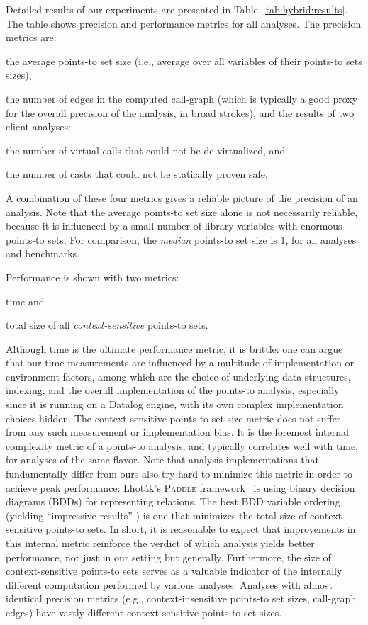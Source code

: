 Detailed results of our experiments are presented in Table~\ref{tab:hybrid:results}.  The table shows precision and performance metrics for all analyses. The precision metrics are:
\begin{inparaenum}[(1)]
\item the average points-to set size (i.e., average over all variables of their
points-to sets sizes),
\item the number of edges in the computed call-graph (which is typically a good proxy for the overall precision of the analysis, in broad strokes), and
the results of two client analyses:
\item the number of virtual calls that could not be de-virtualized, and
\item the number of casts that could not be statically proven safe.
\end{inparaenum}
A combination of these four metrics gives a reliable picture of the precision of an analysis. Note that the average points-to set size alone is not necessarily reliable, because it is influenced by a small number of library variables with enormous points-to sets. For comparison, the \emph{median} points-to set size is 1, for all analyses and benchmarks.

Performance is shown with two metrics:
\begin{inparaenum}[(1)]
\item time and
\item total size of all \emph{context-sensitive} points-to sets.
\end{inparaenum}
Although time is the ultimate performance metric, it is brittle: one can argue that our time measurements are influenced by a multitude of implementation or environment factors, among which are the choice of underlying data structures, indexing, and the overall implementation of the points-to analysis, especially since it is running on a Datalog engine, with its own complex implementation choices hidden. The context-sensitive points-to set size metric does not suffer from any such measurement or implementation bias. It is the foremost internal complexity metric of a points-to analysis, and typically correlates well with time, for analyses of the same flavor. Note that analysis implementations that fundamentally differ from ours also try hard to minimize this metric in order to achieve peak performance: Lhot\'{a}k's \textsc{Paddle} framework~\cite{thesis:Lhotak} is using binary decision diagrams (BDDs) for representing relations. The best BDD variable ordering (yielding ``impressive results'' \cite{pldi:2003:Berndl}) is one that minimizes the total size of context-sensitive points-to sets. In short, it is reasonable to expect that improvements in this internal metric reinforce the verdict of which analysis yields better performance, not just in our setting but generally. Furthermore, the size of context-sensitive points-to sets serves as a valuable indicator of the internally different computation performed by various analyses: Analyses with almost identical precision metrics (e.g., context-insensitive points-to set sizes, call-graph edges) have vastly different context-sensitive points-to set sizes.


